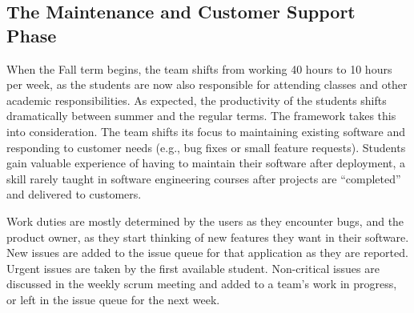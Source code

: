 \subsection{The Maintenance and Customer Support Phase}
When the Fall term begins, the team shifts from working 40 hours to 10 hours per week, as the students are now also responsible for attending classes and other academic responsibilities. As expected, the productivity of the students shifts dramatically between summer and the regular terms. The framework takes this into consideration. The team shifts its focus to maintaining existing software and responding to customer needs (e.g., bug fixes or small feature requests). Students gain valuable experience of having to maintain their software after deployment, a skill rarely taught in software engineering courses after projects are ``completed'' and delivered to customers.


Work duties are mostly determined by the users as they encounter bugs, and the product owner, as they start thinking of new features they want in their software. New issues are added to the issue queue for that application as they are reported. Urgent issues are taken by the first available student. Non-critical issues are discussed in the weekly scrum meeting and added to a team’s work in progress, or left in the issue queue for the next week.


